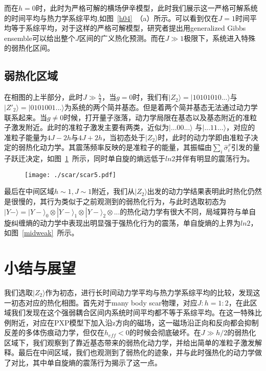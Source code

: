 而在$h=0$时，此时为严格可解的横场伊辛模型，此时我们展示这一严格可解系统的时间平均与热力学系综平均,如图~\ref{h04}~（a）所示。可以看到仅在$J=1$时间平均等于系综平均，对于这样的严格可解模型，研究者提出用generalized Gibbs ensemble可以给出整个$J$区间的广义热化预测\cite{vidmar2016generalized}。而在$J\gg 1$极限下，系统进入特殊的弱热化区间。



\subsection{弱热化区域}
在相图的上半部分，此时$J \gg \frac{h}{2}$，当$g=0$时，我们有$|Z_2\rangle=|10101010...\rangle$与$|Z'_{2}\rangle=|0101001...\rangle$为系统的两个简并基态。但是着两个简并基态无法通过动力学联系起来。当$g\neq 0$时候，打开量子涨落，动力学局限在基态以及基态附近的准粒子激发附近。此时的准粒子激发主要有两类，近似为$|...00...\rangle$
与$|...11...\rangle$，对应的准粒子能量为$4J-2h$与$4J+2h$，当初态处于$|Z_2\rangle$时，此时的动力学即由准粒子决定的弱热化动力学。其震荡频率反映的是准粒子的能量，其振幅由$\sum_i \hat{\sigma}_i^x$引发的量子跃迁决定，如图~\ref{weak}~所示，同时单自旋的熵远低于$ln2$并伴有明显的震荡行为。
\begin{figure}[h]
\centering
\texttt{[image: ./scar/scar5.pdf]}
\label{weak}
\end{figure}

最后在中间区域$h\sim 1, J \sim 1$附近，我们从$|Z_2\rangle$出发的动力学结果表明此时热化仍然是很慢的，其行为类似于之前观测到的弱热化行为，与此时选取初态为$|Y-\rangle = |Y-\rangle_0 \otimes|Y-\rangle_1\otimes |Y-\rangle_2 \otimes... $的热化动力学有很大不同，局域算符与单自旋纠缠熵的动力学中表现出明显强于强热化行为的震荡，单自旋熵的上界为$ln2$，如图~\ref{midweak}~所示。

\section{小结与展望}\label{4sec:sum}
我们选取$|Z_2\rangle$作为初态，进行长时间动力学平均与热力学系综平均的比较，发现这一初态对应的热化相图。首先对于many body scar物理，对应$J:h=1:2$，在此区域我们发现在这个强弱耦合区间内系统时间平均都不等于系综平均。在这一特殊比例附近，对应在PXP模型下加入沿z方向的磁场，这一磁场沿正向和反向都会抑制反差的多体伤痕动力学，但仅在$h_{eff}<0$的时候会彻底破坏。在$J\gg h/2$的弱热化区域下，我们观察到了靠近基态带来的弱热化动力学，并给出简单的准粒子激发解释。最后在中间区域，我们也观测到了弱热化的迹象，并与此时强热化的动力学做了对比，其中单自旋熵的震荡行为揭示了这一点。

